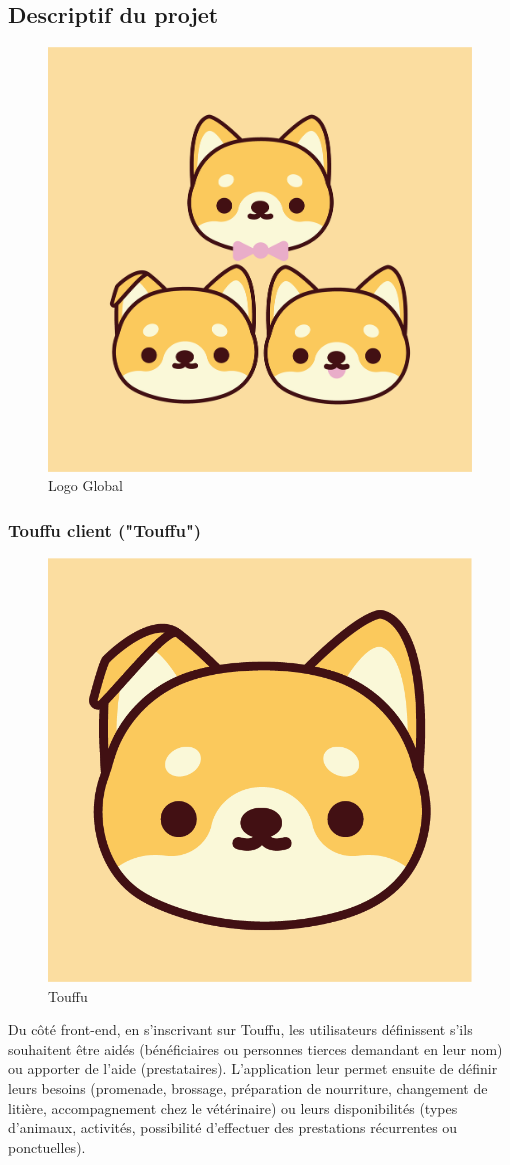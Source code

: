 \documentclass[conference]{IEEEtran}
\begin{document}
\subsection{Descriptif du projet}

\begin{figure}[h]
	\centering
	\includegraphics[width=0.4\columnwidth]{Ressources/Icons/v1_all.png}
	\caption{Logo Global}
	\label{fig:logotouffuall}
\end{figure}

\subsubsection{Touffu client ("Touffu")}\hfil

\begin{figure}[h]
	\centering
	\includegraphics[width=0.4\columnwidth]{Ressources/Icons/v1_2@3x.png}
	\caption{Touffu}
	\label{fig:logotouffu}
\end{figure}

Du côté front-end, en s'inscrivant sur Touffu, les utilisateurs définissent s'ils souhaitent être aidés (bénéficiaires ou personnes tierces demandant en leur nom) ou apporter de l'aide (prestataires). L'application leur permet ensuite de définir leurs besoins (promenade, brossage, préparation de nourriture, changement de litière, accompagnement chez le vétérinaire) ou leurs disponibilités (types d'animaux, activités, possibilité d'effectuer des prestations récurrentes ou ponctuelles).\\
\end{document}
